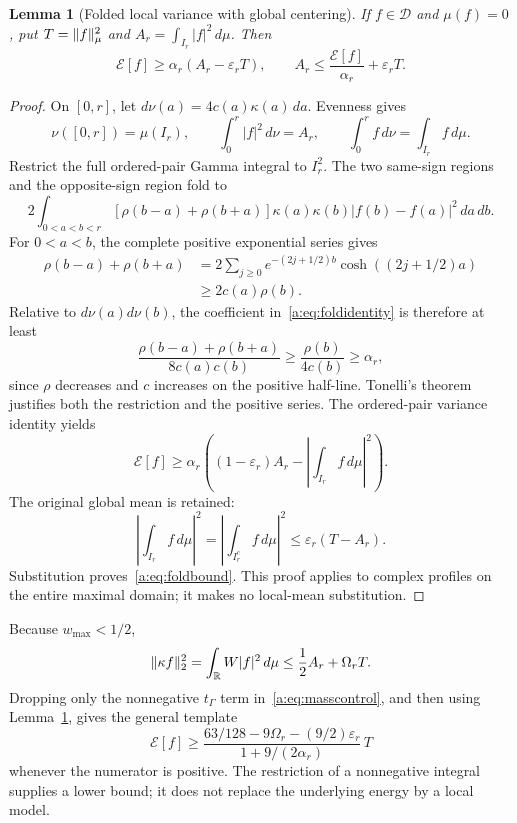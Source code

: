 \documentclass[11pt,a4paper]{article}
\numberwithin{equation}{section}
\newtheorem{lemma}[theorem]{Lemma}
\theoremstyle{definition}\newtheorem{definition}[theorem]{Definition}
\theoremstyle{remark}\newtheorem{remark}[theorem]{Remark}
\newcommand{\R}{\mathbb R}\newcommand{\C}{\mathbb C}\newcommand{\N}{\mathbb N}
\newcommand{\E}{\mathcal E}\newcommand{\D}{\mathcal D}
\newcommand{\tg}{t_\Gamma}\newcommand{\cg}{c_\Gamma}
\begin{document}
\begin{lemma}[Folded local variance with global centering]\label{a:lem:fold}
If $f\in\D$ and $\mu(f)=0$, put $T=\lVert f\rVert_\mu^2$ and
$A_r=\int_{I_r}|f|^2\,d\mu$. Then
\begin{equation}\label{a:eq:foldbound}
 \E[f]\ge\alpha_r(A_r-\varepsilon_rT),\qquad
 A_r\le\frac{\E[f]}{\alpha_r}+\varepsilon_rT.
\end{equation}
\end{lemma}
\begin{proof}
On $[0,r]$, let $d\nu(a)=4c(a)\kappa(a)\,da$. Evenness gives
\[
 \nu([0,r])=\mu(I_r),\qquad
 \int_0^r|f|^2\,d\nu=A_r,\qquad
 \int_0^rf\,d\nu=\int_{I_r}f\,d\mu.
\]
Restrict the full ordered-pair Gamma integral to $I_r^2$. The two same-sign regions and the opposite-sign region fold to
\begin{equation}\label{a:eq:foldidentity}
 2\int_{0<a<b<r}[\rho(b-a)+\rho(b+a)]
       \kappa(a)\kappa(b)|f(b)-f(a)|^2\,da\,db.
\end{equation}
For $0<a<b$, the complete positive exponential series gives
\begin{align*}
 \rho(b-a)+\rho(b+a)
 &=2\sum_{j\ge0}e^{-(2j+1/2)b}\cosh((2j+1/2)a)\\
 &\ge2c(a)\rho(b).
\end{align*}
Relative to $d\nu(a)d\nu(b)$, the coefficient in~\eqref{a:eq:foldidentity} is therefore at least
\[
 \frac{\rho(b-a)+\rho(b+a)}{8c(a)c(b)}
 \ge\frac{\rho(b)}{4c(b)}\ge\alpha_r,
\]
since $\rho$ decreases and $c$ increases on the positive half-line. Tonelli's theorem justifies both the restriction and the positive series. The ordered-pair variance identity yields
\[
 \E[f]\ge\alpha_r\left((1-\varepsilon_r)A_r
                  -\left|\int_{I_r}f\,d\mu\right|^2\right).
\]
The original global mean is retained:
\[
 \left|\int_{I_r}f\,d\mu\right|^2
 =\left|\int_{I_r^c}f\,d\mu\right|^2
 \le\varepsilon_r(T-A_r).
\]
Substitution proves~\eqref{a:eq:foldbound}. This proof applies to complex profiles on the entire maximal domain; it makes no local-mean substitution.
\end{proof}

Because $w_{\max}<1/2$,
\begin{equation}\label{a:eq:masswindow}
 \norm{\kappa f}_2^2=\int_\R W|f|^2\,d\mu
 \le\frac12A_r+\Omega_rT.
\end{equation}
Dropping only the nonnegative $\tg$ term in~\eqref{a:eq:masscontrol}, and then using Lemma~\ref{a:lem:fold}, gives the general template
\begin{equation}\label{a:eq:seedtemplate}
 \E[f]\ge
 \frac{63/128-9\Omega_r-(9/2)\varepsilon_r}
      {1+9/(2\alpha_r)}\,T
\end{equation}
whenever the numerator is positive. The restriction of a nonnegative integral supplies a lower bound; it does not replace the underlying energy by a local model.
\end{document}
